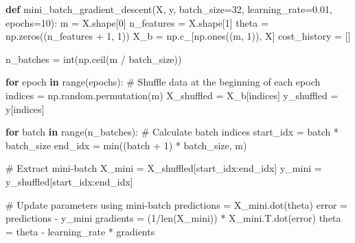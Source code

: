 \documentclass[
  letterpaper,
  DIV=11,
  numbers=noendperiod]{scrreprt}
\newenvironment{Shaded}{\begin{snugshade}}{\end{snugshade}}
\newcommand{\BuiltInTok}[1]{\textcolor[rgb]{0.00,0.23,0.31}{#1}}
\newcommand{\CommentTok}[1]{\textcolor[rgb]{0.37,0.37,0.37}{#1}}
\newcommand{\ControlFlowTok}[1]{\textcolor[rgb]{0.00,0.23,0.31}{\textbf{#1}}}
\newcommand{\DecValTok}[1]{\textcolor[rgb]{0.68,0.00,0.00}{#1}}
\newcommand{\FloatTok}[1]{\textcolor[rgb]{0.68,0.00,0.00}{#1}}
\newcommand{\KeywordTok}[1]{\textcolor[rgb]{0.00,0.23,0.31}{\textbf{#1}}}
\newcommand{\NormalTok}[1]{\textcolor[rgb]{0.00,0.23,0.31}{#1}}
\newcommand{\OperatorTok}[1]{\textcolor[rgb]{0.37,0.37,0.37}{#1}}
\begin{document}
\begin{Shaded}
\begin{Highlighting}[]
\KeywordTok{def}\NormalTok{ mini\_batch\_gradient\_descent(X, y, batch\_size}\OperatorTok{=}\DecValTok{32}\NormalTok{, learning\_rate}\OperatorTok{=}\FloatTok{0.01}\NormalTok{, epochs}\OperatorTok{=}\DecValTok{10}\NormalTok{):}
\NormalTok{    m }\OperatorTok{=}\NormalTok{ X.shape[}\DecValTok{0}\NormalTok{]}
\NormalTok{    n\_features }\OperatorTok{=}\NormalTok{ X.shape[}\DecValTok{1}\NormalTok{]}
\NormalTok{    theta }\OperatorTok{=}\NormalTok{ np.zeros((n\_features }\OperatorTok{+} \DecValTok{1}\NormalTok{, }\DecValTok{1}\NormalTok{))}
\NormalTok{    X\_b }\OperatorTok{=}\NormalTok{ np.c\_[np.ones((m, }\DecValTok{1}\NormalTok{)), X]}
\NormalTok{    cost\_history }\OperatorTok{=}\NormalTok{ []}
    
\NormalTok{    n\_batches }\OperatorTok{=} \BuiltInTok{int}\NormalTok{(np.ceil(m }\OperatorTok{/}\NormalTok{ batch\_size))}
    
    \ControlFlowTok{for}\NormalTok{ epoch }\KeywordTok{in} \BuiltInTok{range}\NormalTok{(epochs):}
        \CommentTok{\# Shuffle data at the beginning of each epoch}
\NormalTok{        indices }\OperatorTok{=}\NormalTok{ np.random.permutation(m)}
\NormalTok{        X\_shuffled }\OperatorTok{=}\NormalTok{ X\_b[indices]}
\NormalTok{        y\_shuffled }\OperatorTok{=}\NormalTok{ y[indices]}
        
        \ControlFlowTok{for}\NormalTok{ batch }\KeywordTok{in} \BuiltInTok{range}\NormalTok{(n\_batches):}
            \CommentTok{\# Calculate batch indices}
\NormalTok{            start\_idx }\OperatorTok{=}\NormalTok{ batch }\OperatorTok{*}\NormalTok{ batch\_size}
\NormalTok{            end\_idx }\OperatorTok{=} \BuiltInTok{min}\NormalTok{((batch }\OperatorTok{+} \DecValTok{1}\NormalTok{) }\OperatorTok{*}\NormalTok{ batch\_size, m)}
            
            \CommentTok{\# Extract mini{-}batch}
\NormalTok{            X\_mini }\OperatorTok{=}\NormalTok{ X\_shuffled[start\_idx:end\_idx]}
\NormalTok{            y\_mini }\OperatorTok{=}\NormalTok{ y\_shuffled[start\_idx:end\_idx]}
            
            \CommentTok{\# Update parameters using mini{-}batch}
\NormalTok{            predictions }\OperatorTok{=}\NormalTok{ X\_mini.dot(theta)}
\NormalTok{            error }\OperatorTok{=}\NormalTok{ predictions }\OperatorTok{{-}}\NormalTok{ y\_mini}
\NormalTok{            gradients }\OperatorTok{=}\NormalTok{ (}\DecValTok{1}\OperatorTok{/}\BuiltInTok{len}\NormalTok{(X\_mini)) }\OperatorTok{*}\NormalTok{ X\_mini.T.dot(error)}
\NormalTok{            theta }\OperatorTok{=}\NormalTok{ theta }\OperatorTok{{-}}\NormalTok{ learning\_rate }\OperatorTok{*}\NormalTok{ gradients}
        

\end{Highlighting}
\end{Shaded}
\end{document}
